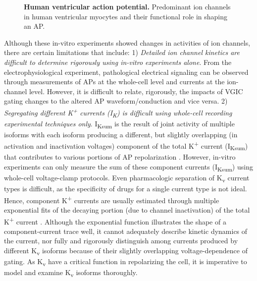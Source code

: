 \documentclass[10pt,letterpaper]{article}
\begin{document}
\begin{figure}[!ht]
    \centering
    \caption{{\bf Human ventricular action potential.} 
    Predominant ion channels in human ventricular myocytes and their functional role in shaping an AP.}
    \label{fig2}
\end{figure}

Although these in-vitro experiments showed changes in activities of ion channels, there are certain limitations that include: 1) \textit{Detailed ion channel kinetics are difficult to determine rigorously using in-vitro experiments alone}. From the electrophysiological experiment, pathological electrical signaling can be observed through measurements of APs at the whole-cell level and currents at the ion-channel level. However, it is difficult to relate, rigorously, the impacts of VGIC gating changes to the altered AP waveform/conduction and vice versa. 2) \textit{Segregating different K\textsuperscript{+} currents (I\textsubscript{K}) is difficult using whole-cell recording experimental techniques only}. I\textsubscript{Ksum} is the result of joint activity of multiple isoforms with each isoform producing a different, but slightly overlapping (in activation and inactivation voltages) component of the total K\textsuperscript{+} current (I\textsubscript{Ksum}) that contributes to various portions of AP repolarization \cite{du2017, jerng2021light}. However, in-vitro experiments can only measure the sum of these component currents (I\textsubscript{Ksum}) using whole-cell voltage-clamp protocols. Even pharmacologic separation of K\textsubscript{v} current types is difficult, as the specificity of drugs for a single current type is not ideal. Hence, component K\textsuperscript{+} currents are usually estimated through multiple exponential fits of the decaying portion (due to channel inactivation) of the total K\textsuperscript{+} current \cite{brunet2004heterogeneous}. Although the exponential function illustrates the shape of a component-current trace well, it cannot adequately describe kinetic dynamics of the current, nor fully and rigorously distinguish among currents produced by different K\textsubscript{v} isoforms because of their slightly overlapping voltage-dependence of gating. As K\textsubscript{v} have a critical function in repolarizing the cell, it is imperative to model and examine K\textsubscript{v} isoforms thoroughly.
\end{document}
